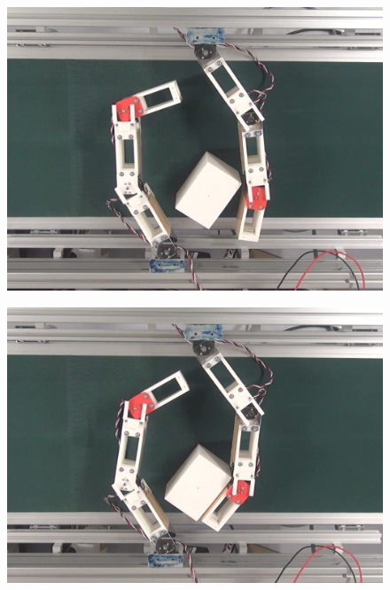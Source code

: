 \documentclass[a4paper,twoside,12pt,papersize, dvipdfmx]{iirthesis}
\begin{document}
\begin{figure}[b]
\centering
\begin{minipage}{0.249\hsize}
\centering
\includegraphics[width=0.98\hsize]{fig/4-manipulation-result/Rectangle/2-1.jpg}
\subcaption{}\label{}
\end{minipage}\hfill
\begin{minipage}{0.249\hsize}
\centering
\includegraphics[width=0.98\hsize]{fig/4-manipulation-result/Rectangle/2-2.jpg}
\subcaption{}\label{}
\end{minipage}\hfill
\begin{minipage}{0.249\hsize}
\centering

\end{minipage}
\end{figure}
\end{document}
